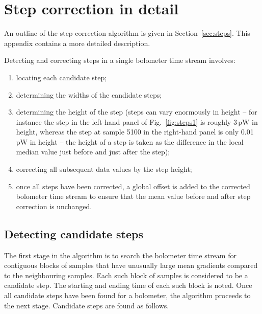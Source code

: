 \documentclass[useAMS,usenatbib,nofootinbib]{mn2e}
\begin{document}



\appendix
\section[]{Step correction in detail}
\label{appendix:steps}

An outline of the step correction algorithm is given in
Section~\ref{sec:steps}. This appendix contains a more detailed
description.

Detecting and correcting steps in a single bolometer time stream involves:

\begin{enumerate}

\item locating each candidate step;

\item determining the widths of the candidate steps;

\item determining the height of the step (steps can vary enormously in
height -- for instance the step in the left-hand panel of
Fig.~\ref{fig:steps1} is roughly 3\,pW in height, whereas the step at
sample 5100 in the right-hand panel is only 0.01\,pW in height -- the
height of a step is taken as the difference in the local median value
just before and just after the step);

\item correcting all subsequent data values by the step height;

\item once all steps have been corrected, a global offset is added to the
corrected bolometer time stream to ensure that the mean value before and
after step correction is unchanged.

\end{enumerate}

\subsection{Detecting candidate steps}
The first stage in the algorithm is to search the bolometer time stream for
contiguous blocks of samples that have unusually large mean gradients
compared to the neighbouring samples. Each such block of samples is
considered to be a candidate step. The starting and ending time of each
such block is noted. Once all candidate steps have been found for a
bolometer, the algorithm proceeds to the next stage. Candidate steps are
found as follows.
\end{document}
